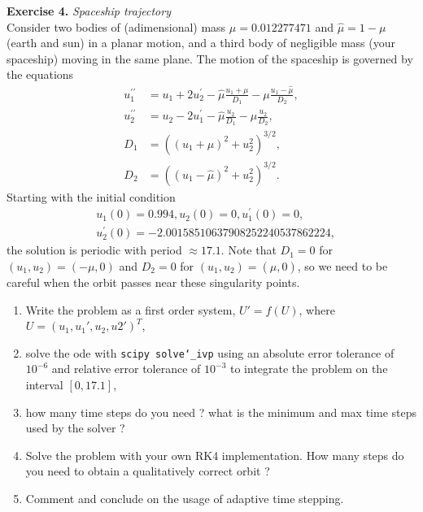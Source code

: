\documentclass{article}
\begin{document}
\vspace{0.5cm}
\noindent \textbf{Exercise 4.} \textit{Spaceship trajectory}  \\
Consider two bodies of (adimensional) mass $\mu = 0.012277471$ and $\hat{\mu} = 1 - \mu$ (earth and sun) in a planar motion, and a third body of negligible mass (your spaceship) moving in the same plane. The motion of the spaceship is governed by the equations
\begin{align*}
u_1^{\prime \prime} & =u_1+2 u_2^{\prime}-\hat{\mu} \frac{u_1+\mu}{D_1}-\mu \frac{u_1-\hat{\mu}}{D_2}, \\
u_2^{\prime \prime} & =u_2-2 u_1^{\prime}-\hat{\mu} \frac{u_2}{D_1}-\mu \frac{u_2}{D_2}, \\
D_1 & =\left(\left(u_1+\mu\right)^2+u_2^2\right)^{3 / 2}, \\
D_2 & =\left(\left(u_1-\hat{\mu}\right)^2+u_2^2\right)^{3 / 2} .
\end{align*}
Starting with the initial condition
\begin{align*}
& u_1(0)=0.994, u_2(0)=0, u_1^{\prime}(0)=0, \\
& u_2^{\prime}(0)=-2.00158510637908252240537862224,
\end{align*}
the solution is periodic with period $\approx 17.1$. Note that $D_1 = 0$ for $(u_1, u_2) = (-\mu,0)$ and $D_2 = 0$ for $(u_1, u_2) = (\hat{\mu},0)$, so we need to be careful when the orbit passes near these singularity points.
\begin{enumerate}
    \item Write the problem as a first order system, $U' = f(U)$, where $U =(u_1,u_1',u_2,u2')^T$,
    \item solve the ode with \texttt{scipy solve\char`_ivp} using an absolute error tolerance of $10^{-6}$ and relative error tolerance of $10^{-3}$ to integrate the problem on the interval
    $[0,17.1]$,
    \item how many time steps do you need ? what is the minimum and max time steps used by the solver ?
    \item Solve the problem with your own RK4 implementation. How many steps do you need to obtain a qualitatively correct orbit ?
    \item Comment and conclude on the usage of adaptive time stepping.
\end{enumerate}
\end{document}
